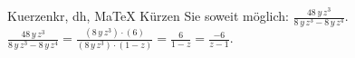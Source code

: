 \begin{MAufgabe}{Kuerzen}{kr, dh, MaTeX}
K\"urzen Sie soweit m\"oglich: $\frac{48\, y\, z^3}{8\, y\, z^3 - 8\, y\, z^4}$.\\ 
\ifLsg\MLoesung
\quad $\frac{48\, y\, z^3}{8\, y\, z^3 - 8\, y\, z^4}=\frac{(8\, y\, z^3)\cdot(6)}{(8\, y\, z^3)\cdot(1 - z)}=\frac{6}{1 - z}=\frac{-6}{z - 1}$.\else\relax\fi
 \end{MAufgabe}
